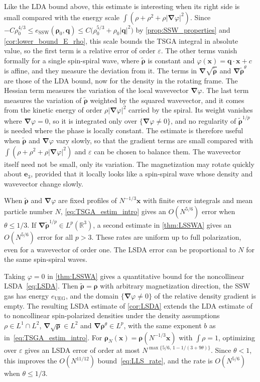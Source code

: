 \documentclass[final,reqno]{amsart}
\theoremstyle{remark}
\renewcommand{\le}{\leqslant}
\renewcommand{\epsilon}{\varepsilon}
\newcommand{\wt}[1]{\widetilde{#1}}
\newcommand{\RR}{\mathbb{R}}
\newcommand{\UEG}{\mathrm{UEG}}
\newcommand{\SSW}{\mathrm{SSW}}
\newcommand{\grad}{\bm{\nabla}}
\begin{document}
Like the LDA bound above, this estimate is interesting when its right side is small compared with the energy scale $\int(\rho+\rho^2+\rho|\grad\varphi|^2)$. Since $-C\rho_0^{4/3}\le e_\SSW(\bm{\rho}_0,\mathbf{q})\le C\big(\rho_0^{5/3}+\rho_0|\mathbf{q}|^2\big)$ by \cref{prop:SSW_properties} and \cref{cor:lower_bound_E_rho}, this scale bounds the TSGA integral in absolute value, so the first term is a relative error of order $\epsilon$. The other terms vanish formally for a single spin-spiral wave, where $\wt{\bm{\rho}}$ is constant and $\varphi(\mathbf{x})=\mathbf{q}\cdot\mathbf{x}+c$ is affine, and they measure the deviation from it. The terms in $\grad\sqrt{\wt{\bm{\rho}}}$ and $\grad\wt{\bm{\rho}}^\theta$ are those of the LDA bound, now for the density in the rotating frame. The Hessian term measures the variation of the local wavevector $\grad\varphi$. The last term measures the variation of $\wt{\bm{\rho}}$ weighted by the squared wavevector, and it comes from the kinetic energy of order $\rho|\grad\varphi|^2$ carried by the spiral. Its weight vanishes where $\grad\varphi=0$, so it is integrated only over $\{\grad\varphi\ne0\}$, and no regularity of $\wt{\bm{\rho}}^{1/p}$ is needed where the phase is locally constant. The estimate is therefore useful when $\wt{\bm{\rho}}$ and $\grad\varphi$ vary slowly, so that the gradient terms are small compared with $\int(\rho+\rho^2+\rho|\grad\varphi|^2)$ and $\epsilon$ can be chosen to balance them. The wavevector itself need not be small, only its variation. The magnetization may rotate quickly about $\mathbf{e}_3$, provided that it locally looks like a spin-spiral wave whose density and wavevector change slowly.

When $\wt{\bm{\rho}}$ and $\grad\varphi$ are fixed profiles of $N^{-1/3}\mathbf{x}$ with finite error integrals and mean particle number $N$, \cref{eq:TSGA_estim_intro} gives an $O(N^{5/6})$ error when $\theta\le1/3$. If $\grad\wt{\bm{\rho}}^{1/p}\in L^p(\RR^3)$, a second estimate in \cref{thm:LSSWA} gives an $O(N^{5/6})$ error for all $p>3$. These rates are uniform up to full polarization, even for a wavevector of order one. The LSDA error can be proportional to $N$ for the same spin-spiral waves.

Taking $\varphi=0$ in \cref{thm:LSSWA} gives a quantitative bound for the noncollinear LSDA~\cref{eq:LSDA}. Then $\wt{\bm{\rho}}=\bm{\rho}$ with arbitrary magnetization direction, the SSW gas has energy $e_\UEG$, and the domain $\{\grad\varphi\ne0\}$ of the relative density gradient is empty. The resulting LSDA estimate of \cref{cor:LSDA} extends the LDA estimate of~\cite{lewin2020local} to noncollinear spin-polarized densities under the density assumptions $\rho\in L^1\cap L^2$, $\grad\sqrt{\bm{\rho}}\in L^2$ and $\grad\bm{\rho}^{\theta}\in L^p$, with the same exponent $b$ as in~\cref{eq:TSGA_estim_intro}. For $\bm{\rho}_N(\mathbf{x})=\bm{\rho}(N^{-1/3}\mathbf{x})$ with $\int\rho=1$, optimizing over $\epsilon$ gives an LSDA error of order at most $N^{\max\{5/6,\,1-1/(3+9\theta)\}}$. Since $\theta<1$, this improves the $O(N^{11/12})$ bound~\cref{eq:LLS_rate}, and the rate is $O(N^{5/6})$ when $\theta\le1/3$.
\end{document}
